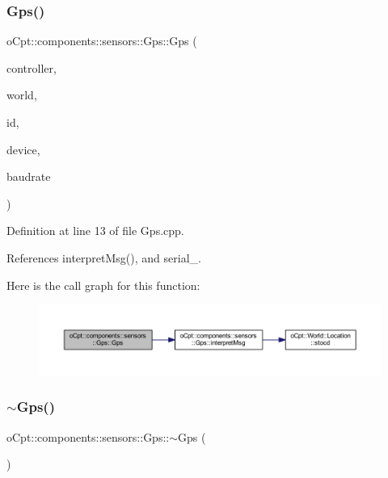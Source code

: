 \subsubsection{\texorpdfstring{Gps()}{Gps()}}
{\footnotesize\ttfamily o\+Cpt\+::components\+::sensors\+::\+Gps\+::\+Gps (\begin{DoxyParamCaption}\item[{\hyperlink{classo_cpt_1_1i_controller_a6d89a95cd6ad68bb74adfaca2f36370f}{i\+Controller\+::ptr}}]{controller,  }\item[{\hyperlink{classo_cpt_1_1_world_aa6e591e3096d5de71e0cec9039663d67}{World\+::ptr}}]{world,  }\item[{std\+::string}]{id,  }\item[{std\+::string}]{device,  }\item[{unsigned int}]{baudrate }\end{DoxyParamCaption})}



Definition at line 13 of file Gps.\+cpp.



References interpret\+Msg(), and serial\+\_\+.

Here is the call graph for this function\+:\nopagebreak
\begin{figure}[H]
\begin{center}
\leavevmode
\includegraphics[width=350pt]{classo_cpt_1_1components_1_1sensors_1_1_gps_a24c1c7c95c57f9c5fa47d0640ba5d6dc_cgraph}
\end{center}
\end{figure}
\hypertarget{classo_cpt_1_1components_1_1sensors_1_1_gps_aa8c7fc77c287b439f9d33bc8cfda1e68}{}\label{classo_cpt_1_1components_1_1sensors_1_1_gps_aa8c7fc77c287b439f9d33bc8cfda1e68} 
\subsubsection{\texorpdfstring{$\sim$\+Gps()}{~Gps()}}
{\footnotesize\ttfamily o\+Cpt\+::components\+::sensors\+::\+Gps\+::$\sim$\+Gps (\begin{DoxyParamCaption}{ }\end{DoxyParamCaption})}



